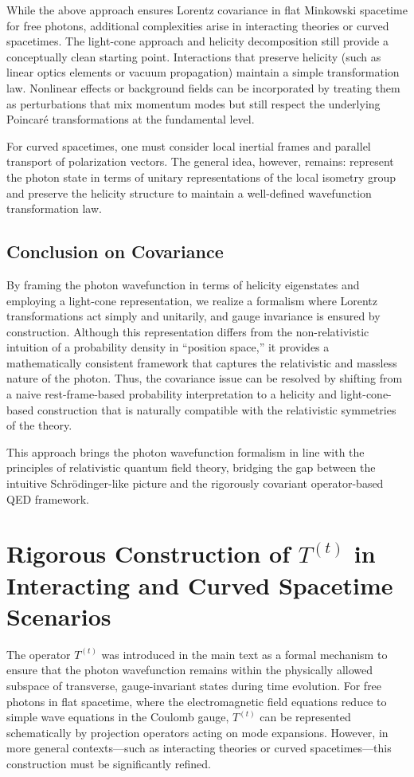 \documentclass[aps,prl,twocolumn,showpacs,showkeys,superscriptaddress,amsmath,amssymb]{revtex4-2}
\begin{document}
While the above approach ensures Lorentz covariance in flat Minkowski spacetime for free photons, additional complexities arise in interacting theories or curved spacetimes. The light-cone approach and helicity decomposition still provide a conceptually clean starting point. Interactions that preserve helicity (such as linear optics elements or vacuum propagation) maintain a simple transformation law. Nonlinear effects or background fields can be incorporated by treating them as perturbations that mix momentum modes but still respect the underlying Poincaré transformations at the fundamental level.

For curved spacetimes, one must consider local inertial frames and parallel transport of polarization vectors. The general idea, however, remains: represent the photon state in terms of unitary representations of the local isometry group and preserve the helicity structure to maintain a well-defined wavefunction transformation law.

\subsection{Conclusion on Covariance}

By framing the photon wavefunction in terms of helicity eigenstates and employing a light-cone representation, we realize a formalism where Lorentz transformations act simply and unitarily, and gauge invariance is ensured by construction. Although this representation differs from the non-relativistic intuition of a probability density in “position space,” it provides a mathematically consistent framework that captures the relativistic and massless nature of the photon. Thus, the covariance issue can be resolved by shifting from a naive rest-frame-based probability interpretation to a helicity and light-cone-based construction that is naturally compatible with the relativistic symmetries of the theory.

This approach brings the photon wavefunction formalism in line with the principles of relativistic quantum field theory, bridging the gap between the intuitive Schrödinger-like picture and the rigorously covariant operator-based QED framework.
\section{Rigorous Construction of \texorpdfstring{$T^{(t)}$}{T(t)} in Interacting and Curved Spacetime Scenarios}

The operator $T^{(t)}$ was introduced in the main text as a formal mechanism to ensure that the photon wavefunction remains within the physically allowed subspace of transverse, gauge-invariant states during time evolution. For free photons in flat spacetime, where the electromagnetic field equations reduce to simple wave equations in the Coulomb gauge, $T^{(t)}$ can be represented schematically by projection operators acting on mode expansions. However, in more general contexts—such as interacting theories or curved spacetimes—this construction must be significantly refined.
\end{document}
